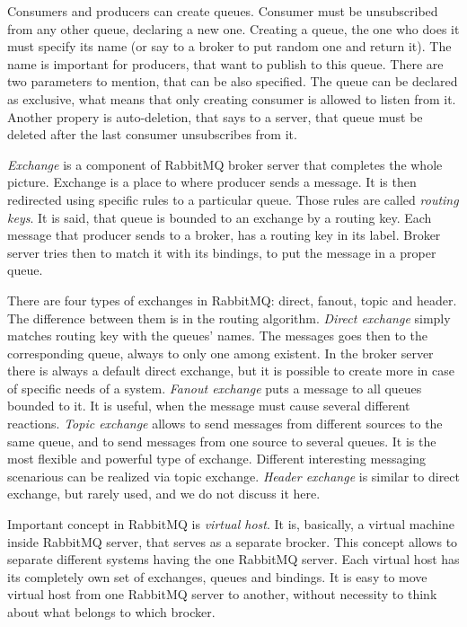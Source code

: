 Consumers and producers can create queues.
Consumer must be unsubscribed from any other queue, declaring a new one.
Creating a queue, the one who does it must specify its name (or say to a broker to put random one and return it).
The name is important for producers, that want to publish to this queue.
There are two parameters to mention, that can be also specified.
The queue can be declared as exclusive, what means that only creating consumer is allowed to listen from it.
Another propery is auto-deletion, that says to a server, that queue must be deleted after the last consumer unsubscribes from it.

\textit{Exchange}  is a component of RabbitMQ broker server that completes the whole picture.
Exchange is a place to where producer sends a message.
It is then redirected using specific rules to a particular queue.
Those rules are called \textit{routing keys}.
It is said, that queue is bounded to an exchange by a routing key.
Each message that producer sends to a broker, has a routing key in its label.
Broker server tries then to match it with its bindings, to put the message in a proper queue.

There are four types of exchanges in RabbitMQ: direct, fanout, topic and header.
The difference between them is in the routing algorithm.
\textit{Direct exchange} simply matches routing key with the queues' names.
The messages goes then to the corresponding queue, always to only one among existent.
In the broker server there is always a default direct exchange, but it is possible to create more in case of specific needs of a system.
\textit{Fanout exchange} puts a message to all queues bounded to it.
It is useful, when the message must cause several different reactions.
\textit{Topic exchange} allows to send messages from different sources to the same queue, and to send messages from one source to several queues.
It is the most flexible and powerful type of exchange.
Different interesting messaging scenarious can be realized via topic exchange.
\textit{Header exchange} is similar to direct exchange, but rarely used, and we do not discuss it here.

Important concept in RabbitMQ is \textit{virtual host}.
It is, basically, a virtual machine inside RabbitMQ server, that serves as a separate brocker.
This concept allows to separate different systems having the one RabbitMQ server.
Each virtual host has its completely own set of exchanges, queues and bindings.
It is easy to move virtual host from one RabbitMQ server to another, without necessity to think about what belongs to which brocker.

